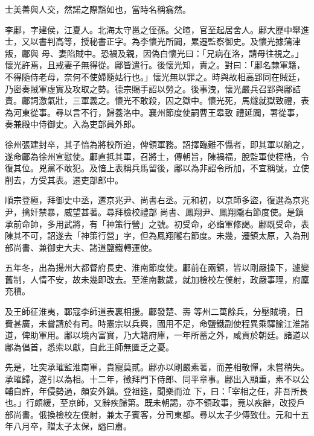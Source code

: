 \begin{pinyinscope}
 士美善與人交，然諾之際豁如也，當時名稱翕然。



 李鄘，字建侯，江夏人。北海太守邕之侄孫。父暄，官至起居舍人。鄘大歷中舉進士，又以書判高等，授秘書正字。為李懷光所闢，累遷監察御史。及懷光據蒲津叛，鄘與
 母、妻陷賊中。恐禍及親，因偽白懷光曰：「兄病在洛，請母往視之。」懷光許焉，且戒妻子無得從。鄘皆遣行。後懷光知，責之。對曰：「鄘名隸軍籍，不得隨侍老母，奈何不使婦隨姑行也。」懷光無以罪之。時與故相高郢同在賊廷，乃密奏賊軍虛實及攻取之勢。德宗賜手詔以勞之。後事洩，懷光嚴兵召郢與鄘詰責。鄘詞激氣壯，三軍義之。懷光不敢殺，囚之獄中。懷光死，馬燧就獄致禮，表為河東從事。尋以言不行，歸養洛中。襄州節度使嗣曹王皋致
 禮延闢，署從事，奏兼殿中侍御史。入為吏部員外郎。



 徐州張建封卒，其子愔為將校所迫，俾領軍務。詔擇臨難不懾者，即其軍以諭之，遂命鄘為徐州宣慰使。鄘直抵其軍，召將士，傳朝旨，陳禍福，脫監軍使桎梏，令復其位。兇黨不敢犯。及愔上表稱兵馬留後，鄘以為非詔令所加，不宜稱號，立使削去，方受其表。遷吏部郎中。



 順宗登極，拜御史中丞，遷京兆尹、尚書右丞。元和初，以京師多盜，復選為京兆尹，擒奸禁暴，威望甚著。尋拜檢校禮部
 尚書、鳳翔尹、鳳翔隴右節度使。是鎮承前命帥，多用武將，有「神策行營」之號。初受命，必詣軍修謁。鄘既受命，表陳其不可，詔遂去「神策行營」字，但為鳳翔隴右節度。未幾，遷鎮太原，入為刑部尚書、兼御史大夫、諸道鹽鐵轉運使。



 五年冬，出為揚州大都督府長史、淮南節度使。鄘前在兩鎮，皆以剛嚴操下，遽變舊制，人情不安，故未幾即改去。至淮南數歲，就加檢校左僕射，政嚴事理，府廩充積。



 及王師征淮夷，鄆寇李師道表裏相援。鄘發楚、壽
 等州二萬餘兵，分壓賊境，日費甚廣，未嘗請於有司。時憲宗以兵興，國用不足，命鹽鐵副使程異乘驛諭江淮諸道，俾助軍用。鄘以境內富實，乃大籍府庫，一年所蓄之外，咸貢於朝廷。諸道以鄘為倡首，悉索以獻，自此王師無匱乏之憂。



 先是，吐突承璀監淮南軍，貴寵莫貳。鄘亦以剛嚴素著，而差相敬憚，未嘗稍失。承璀歸，遂引以為相。十二年，徵拜門下侍郎、同平章事。鄘出入顯重，素不以公輔自許，年侵勢過，頗安外鎮。登祖筵，聞樂而泣
 下，曰：「宰相之任，非吾所長也。」行頗緩，至京師，又辭疾歸第。既未朝謁，亦不領政事，竟以疾辭，改授戶部尚書。俄換檢校左僕射，兼太子賓客，分司東都。尋以太子少傅致仕。元和十五年八月卒，贈太子太保，謚曰肅。




\end{pinyinscope}
